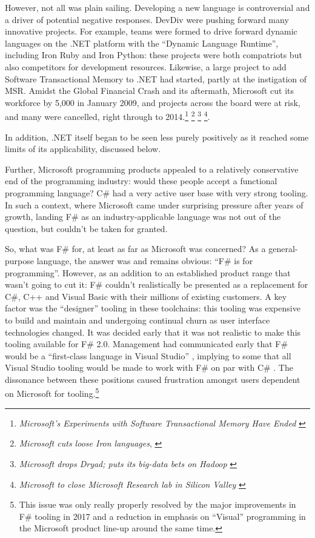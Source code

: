 \documentclass[acmsmall,screen]{acmart}
\begin{document}
However, not all was plain sailing.  Developing a new language is controversial and a driver of potential
negative responses. DevDiv were pushing forward many innovative projects. For example, teams
were formed to drive forward dynamic languages on the .NET platform with the “Dynamic Language Runtime”, including
Iron Ruby and Iron Python: these projects were both compatriots but also competitors for development
resources. Likewise, a large project to add Software Transactional Memory to .NET had started, partly
at the instigation of MSR. Amidst the Global Financial Crash and its aftermath, Microsoft cut its workforce
by 5,000 in January 2009, and projects across the board were at risk, and many were cancelled, right
through to 2014.\footnote{\textit{Microsoft’s Experiments with Software Transactional Memory Have Ended} \citep{RefSTMEnds}}
\footnote{\textit{Microsoft cuts loose Iron languages}, \citep{RefIronCut}}
\footnote{\textit{Microsoft drops Dryad; puts its big-data bets on Hadoop} \citep{RefDryadCut}}
\footnote{\textit{Microsoft to close Microsoft Research lab in Silicon Valley} \citep{RefSVCut}}.

In addition, .NET itself began to be seen less purely positively as it reached some limits of its applicability, discussed below.

Further, Microsoft programming products appealed to a relatively conservative end of the programming industry: would
these people accept a functional programming language? C\# had a very active user base with very strong tooling. In
such a context, where Microsoft came under surprising pressure after years of growth, landing F\# as an industry-applicable
language was not out of the question, but couldn’t be taken for granted.


So, what was F\# for, at least as far as Microsoft was concerned?  As a general-purpose language, the answer was and remains
obvious: “F\# is for programming”.  However, as an addition to an established product range that wasn’t going
to cut it: F\# couldn’t realistically be presented as a replacement for C\#, C++ and Visual Basic with their millions of existing customers.
A key factor was the “designer” tooling in these toolchains: this tooling was expensive to build and maintain and undergoing continual
churn as user interface technologies changed. It was decided early that it was not realistic to make this tooling available for F\# 2.0.
Management had communicated early that F\# would be a “first-class language in Visual Studio” , implying to some that all Visual Studio
tooling would be made to work with F\# on par with C\# \citep{RefSomaBlog}.
The dissonance between these positions caused frustration amongst users dependent on Microsoft for
tooling.\footnote{This issue was only really properly resolved by the major improvements in F\# tooling in 2017 and a reduction in emphasis on “Visual” programming in the Microsoft product line-up around the same time.}
\end{document}
